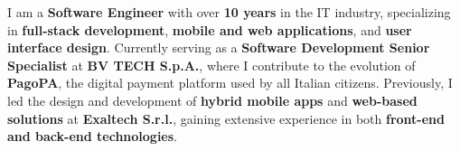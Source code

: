 

\begin{cvparagraph}

I am a \textbf{Software Engineer} with over \textbf{10 years} in the IT industry, specializing in \textbf{full-stack development}, \textbf{mobile and web applications}, and \textbf{user interface design}. Currently serving as a \textbf{Software Development Senior Specialist} at \textbf{BV TECH S.p.A.}, where I contribute to the evolution of \textbf{PagoPA}, the digital payment platform used by all Italian citizens. 
Previously, I led the design and development of \textbf{hybrid mobile apps} and \textbf{web-based solutions} at \textbf{Exaltech S.r.l.}, gaining extensive experience in both \textbf{front-end and back-end technologies}.

\end{cvparagraph}
